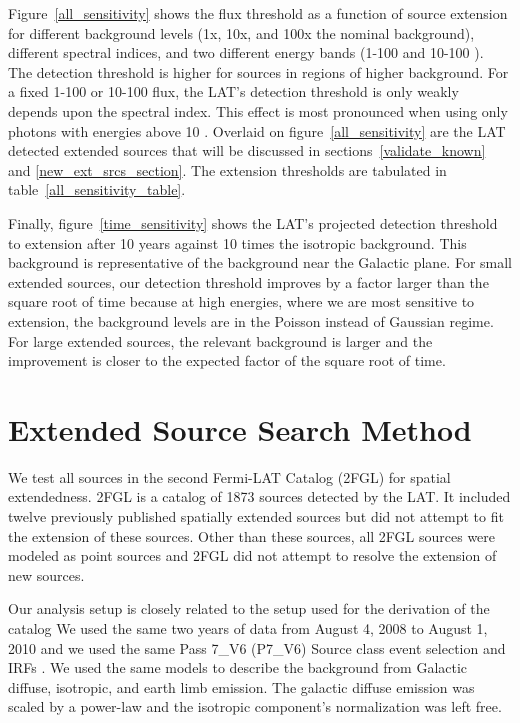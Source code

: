 \documentclass[12pt,preprint]{aastex}
\newcommand{\gev}{\text{GeV}\xspace}
\begin{document}
\begin{shaded} Figure~\ref{all_sensitivity} shows the flux threshold
as a function of source extension for different background levels (1x,
10x, and 100x the nominal background), different spectral indices, and
two different energy bands (1-100 \gev and 10-100 \gev).  The detection
threshold is higher for sources in regions of higher background.  For a
fixed 1-100 \gev or 10-100 \gev flux, the LAT's detection threshold
is only weakly depends upon the spectral index.  This effect is most
pronounced when using only photons with energies above 10 \gev.  Overlaid
on figure~\ref{all_sensitivity} are the LAT detected extended sources
that will be discussed in sections~\ref{validate_known}
and \ref{new_ext_srcs_section}.  The extension thresholds are tabulated
in table~\ref{all_sensitivity_table}.

Finally, figure~\ref{time_sensitivity} shows the LAT's projected detection
threshold to extension after 10 years against 10 times the isotropic
background. This background is representative of the background near
the Galactic plane.  For small extended sources, our detection threshold
improves by a factor larger than the square root of time because at high energies, where we
are most sensitive to extension, the background levels are in the Poisson
instead of Gaussian regime.  For large extended sources, the relevant
background is larger and the improvement is closer to the expected
factor of the square root of time.
\end{shaded}


\section{Extended Source Search Method}
\label{extended_source_search_method}

We test all sources in the 
second Fermi-LAT Catalog (2FGL) for spatial extendedness.
2FGL is a catalog of 1873 sources detected by the LAT.  It included
twelve previously published spatially extended sources but did not
attempt to fit the extension of these sources. Other than these sources,
all 2FGL sources were modeled as point sources and 2FGL did not attempt
to resolve the extension of new sources.

Our analysis setup is closely related to the setup used for the
derivation of the catalog We used the same two years of data from August
4, 2008 to August 1, 2010 and we used the same Pass 7\_V6 (P7\_V6)
Source class event selection and IRFs \citep{lat_on_orbit_psf}.  We used the same models to describe the
background from Galactic diffuse, isotropic, and earth limb emission.
The galactic diffuse emission was scaled by a power-law and the isotropic
component's normalization was left free.
\end{document}
